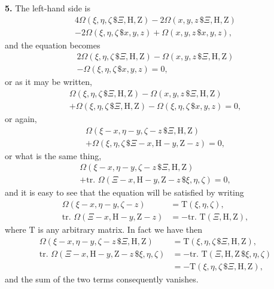 \documentclass[12pt,a4paper]{article}
\theoremstyle{definition}
\begin{document}
\medskip
\noindent\textbf{5.} The left-hand side is
\begin{multline*}
4\Omega(\xi,\eta,\zeta\,\$\Xi,\mathrm{H},\mathrm{Z})
- 2\Omega(x,y,z\,\$\Xi,\mathrm{H},\mathrm{Z}) \\
- 2\Omega(\xi,\eta,\zeta\,\$x,y,z)
+ \Omega(x,y,z\,\$x,y,z),
\end{multline*}
and the equation becomes
\begin{multline*}
2\Omega(\xi,\eta,\zeta\,\$\Xi,\mathrm{H},\mathrm{Z})
- \Omega(x,y,z\,\$\Xi,\mathrm{H},\mathrm{Z}) \\
- \Omega(\xi,\eta,\zeta\,\$x,y,z) = 0,
\end{multline*}
or as it may be written,
\begin{multline*}
\Omega(\xi,\eta,\zeta\,\$\Xi,\mathrm{H},\mathrm{Z})
- \Omega(x,y,z\,\$\Xi,\mathrm{H},\mathrm{Z}) \\
+ \Omega(\xi,\eta,\zeta\,\$\Xi,\mathrm{H},\mathrm{Z})
- \Omega(\xi,\eta,\zeta\,\$x,y,z) = 0,
\end{multline*}
or again,
\begin{multline*}
\Omega(\xi-x, \eta-y, \zeta-z\,\$\Xi,\mathrm{H},\mathrm{Z}) \\
+ \Omega(\xi,\eta,\zeta\,\$\Xi-x, \mathrm{H}-y, \mathrm{Z}-z) = 0,
\end{multline*}
or what is the same thing,
\begin{multline*}
\Omega(\xi-x, \eta-y, \zeta-z\,\$\Xi,\mathrm{H},\mathrm{Z}) \\
+ \text{tr. }\Omega(\Xi-x, \mathrm{H}-y, \mathrm{Z}-z\,\$\xi,\eta,\zeta) = 0,
\end{multline*}
and it is easy to see that the equation will be satisfied by writing
\begin{align*}
\Omega(\xi-x, \eta-y, \zeta-z) &= \mathrm{T}(\xi,\eta,\zeta), \\
\text{tr. }\Omega(\Xi-x, \mathrm{H}-y, \mathrm{Z}-z) &= -\text{tr. }\mathrm{T}(\Xi,\mathrm{H},\mathrm{Z}),
\end{align*}
where $\mathrm{T}$ is any arbitrary matrix. In fact we have then
\begin{align*}
\Omega(\xi-x, \eta-y, \zeta-z\,\$\Xi,\mathrm{H},\mathrm{Z})
&= \mathrm{T}(\xi,\eta,\zeta\,\$\Xi,\mathrm{H},\mathrm{Z}), \\
\text{tr. }\Omega(\Xi-x, \mathrm{H}-y, \mathrm{Z}-z\,\$\xi,\eta,\zeta)
&= -\text{tr. }\mathrm{T}(\Xi,\mathrm{H},\mathrm{Z}\,\$\xi,\eta,\zeta) \\
&= -\mathrm{T}(\xi,\eta,\zeta\,\$\Xi,\mathrm{H},\mathrm{Z}),
\end{align*}
and the sum of the two terms consequently vanishes.
\end{document}
